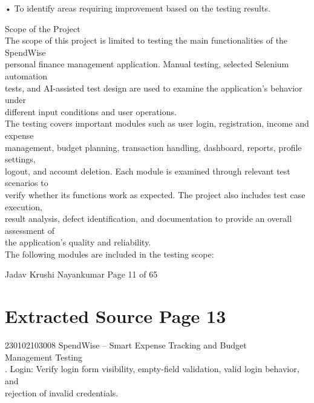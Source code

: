 \documentclass[12pt,a4paper]{report}
\begin{document}
\smallskip
• To identify areas requiring improvement based on the testing results.\\ 

\smallskip

 Scope of the Project\\ 

\smallskip
The scope of this project is limited to testing the main functionalities of the SpendWise\\ 
personal finance management application. Manual testing, selected Selenium automation\\ 
tests, and AI-assisted test design are used to examine the application’s behavior under\\ 
different input conditions and user operations.\\ 
The testing covers important modules such as user login, registration, income and expense\\ 
management, budget planning, transaction handling, dashboard, reports, profile settings,\\ 
logout, and account deletion. Each module is examined through relevant test scenarios to\\ 
verify whether its functions work as expected. The project also includes test case execution,\\ 
result analysis, defect identification, and documentation to provide an overall assessment of\\ 
the application’s quality and reliability.\\ 
The following modules are included in the testing scope:\\ 

\smallskip

\smallskip

\smallskip

\smallskip
Jadav Krushi Nayankumar                                                      Page 11 of 65\\ 

\clearpage
\section*{Extracted Source Page 13}
230102103008                        SpendWise – Smart Expense Tracking and Budget\\ 
Management Testing\\ 

. Login: Verify login form visibility, empty-field validation, valid login behavior, and\\ 
rejection of invalid credentials.\\ 
\end{document}
